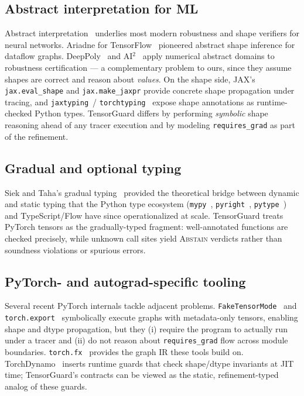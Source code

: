 \subsection{Abstract interpretation for ML}

Abstract interpretation~\citep{cousot1977ai} underlies most modern
robustness and shape verifiers for neural networks. Ariadne for
TensorFlow~\citep{dolby2018ariadne} pioneered abstract shape
inference for dataflow graphs.
DeepPoly~\citep{singh2019deeppoly} and
AI$^2$~\citep{gehr2018ai2} apply numerical abstract domains to
robustness certification --- a complementary problem to ours, since
they assume shapes are correct and reason about \emph{values}. On
the shape side, JAX's \texttt{jax.eval\_shape} and
\texttt{jax.make\_jaxpr} provide concrete shape propagation under
tracing, and \texttt{jaxtyping}~\citep{jaxtyping}/
\texttt{torchtyping}~\citep{torchtyping} expose shape annotations as
runtime-checked Python types. TensorGuard differs by performing
\emph{symbolic} shape reasoning ahead of any tracer execution and by
modeling \texttt{requires\_grad} as part of the refinement.

\subsection{Gradual and optional typing}

Siek and Taha's gradual typing~\citep{siek2006gradual} provided the
theoretical bridge between dynamic and static typing that the Python
type ecosystem
(\texttt{mypy}~\citep{mypy}, \texttt{pyright}~\citep{pyright},
\texttt{pytype}~\citep{pytype}) and TypeScript/Flow have since
operationalized at scale. TensorGuard treats PyTorch tensors as the
gradually-typed fragment: well-annotated functions are checked
precisely, while unknown call sites yield \textsc{Abstain} verdicts
rather than soundness violations or spurious errors.

\subsection{PyTorch- and autograd-specific tooling}

Several recent PyTorch internals tackle adjacent problems.
\texttt{FakeTensorMode}~\citep{faketensor} and
\texttt{torch.export}~\citep{torchexport} symbolically execute graphs
with metadata-only tensors, enabling shape and dtype propagation, but
they (i) require the program to actually run under a tracer and
(ii) do not reason about \texttt{requires\_grad} flow across module
boundaries. \texttt{torch.fx}~\citep{reed2022torchfx} provides the
graph IR these tools build on. TorchDynamo~\citep{ansel2024pytorch2}
inserts runtime guards that check shape/dtype invariants at JIT time;
TensorGuard's contracts can be viewed as the static, refinement-typed
analog of these guards.

